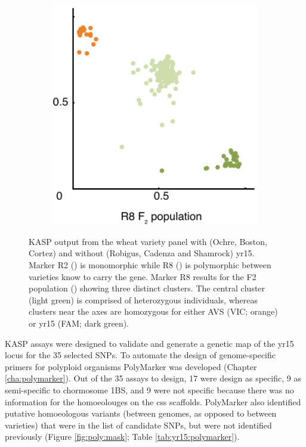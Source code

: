 \begin{figure}
\begin{subfigure}{0.31\textwidth}
\end{subfigure}
~
\begin{subfigure}{0.31\textwidth}
\caption{}
\label{fig:yr15:r8f2}
\includegraphics[width=1\textwidth]{Yr15/Figures/selection/R8f2.pdf}
\end{subfigure}

\caption{KASP output from the wheat variety panel with (Ochre, Boston, Cortez) and without (Robigus, Cadenza and Shamrock) \acrshort{yr15}. Marker  R2 () is monomorphic while R8 ()  is polymorphic between varieties know to carry the gene.  Marker R8 results for the F2 population () showing three distinct clusters. The central cluster (light green) is comprised of heterozygous individuals, whereas clusters near the axes are homozygous for either AVS (VIC; orange) or \acrshort{yr15} (FAM; dark green).}
\end{figure}



KASP assays were designed to validate and generate a genetic map of the \acrshort{yr15} locus for the 35 selected SNPs. 
To automate the design of genome-specific primers for polyploid organisms PolyMarker was developed (Chapter \ref{cha:polymarker}).
Out of the 35 assays to design, 17 were design as specific, 9 as semi-specific to chormosome 1BS, and 9 were not specific because there was no information for the homoeolouges on the \acrshort{css} scaffolds. 
PolyMarker also identified putative homoeologous variants (between genomes, as opposed to between varieties) that were in the list of candidate SNPs, but were not identified previously (Figure \ref{fig:poly:mask}; Table \ref{tab:yr15:polymarker}). 

